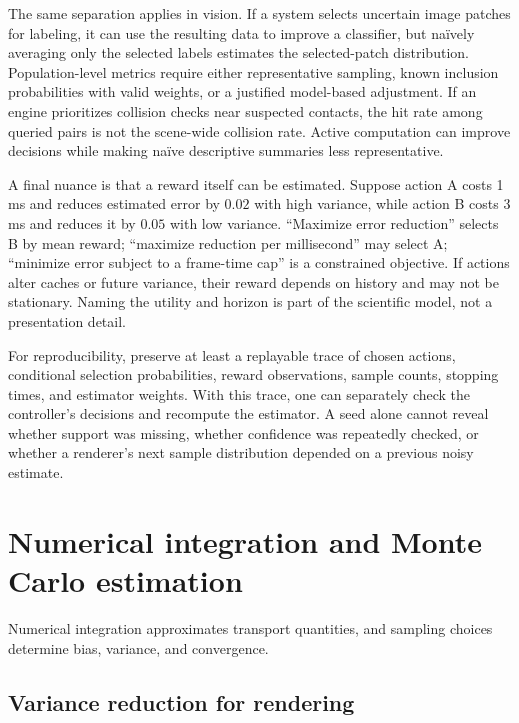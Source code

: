 The same separation applies in vision. If a system selects uncertain image patches for labeling, it can use the resulting data to improve a classifier, but naïvely averaging only the selected labels estimates the selected-patch distribution. Population-level metrics require either representative sampling, known inclusion probabilities with valid weights, or a justified model-based adjustment. If an engine prioritizes collision checks near suspected contacts, the hit rate among queried pairs is not the scene-wide collision rate. Active computation can improve decisions while making naïve descriptive summaries less representative.

A final nuance is that a reward itself can be estimated. Suppose action A costs 1 ms and reduces estimated error by \(0.02\) with high variance, while action B costs 3 ms and reduces it by \(0.05\) with low variance. ``Maximize error reduction'' selects B by mean reward; ``maximize reduction per millisecond'' may select A; ``minimize error subject to a frame-time cap'' is a constrained objective. If actions alter caches or future variance, their reward depends on history and may not be stationary. Naming the utility and horizon is part of the scientific model, not a presentation detail.

For reproducibility, preserve at least a replayable trace of chosen actions, conditional selection probabilities, reward observations, sample counts, stopping times, and estimator weights. With this trace, one can separately check the controller's decisions and recompute the estimator. A seed alone cannot reveal whether support was missing, whether confidence was repeatedly checked, or whether a renderer's next sample distribution depended on a previous noisy estimate.

\section{Numerical integration and Monte Carlo estimation}\label{03-visual-computing-i-ch012-numerical-integration-and-monte-carlo-estimation}

Numerical integration approximates transport quantities, and sampling choices determine bias, variance, and convergence.

\subsection{Variance reduction for rendering}\label{03-visual-computing-i-ch012-variance-reduction-for-rendering}


